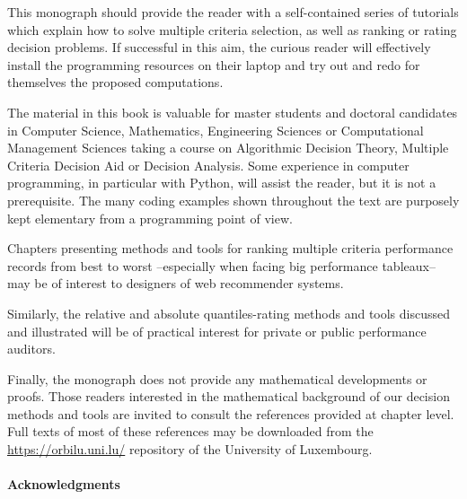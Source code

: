 
This monograph should provide the reader with a self-contained series of tutorials which explain how to solve multiple criteria selection, as well as ranking or rating decision problems. If successful in this aim, the curious reader will effectively install the \Digraph programming resources on their laptop and try out and redo for themselves the proposed computations.


The material in this book is valuable for master students and doctoral candidates in Computer Science, Mathematics, Engineering Sciences or Computational Management Sciences taking a course on Algorithmic Decision Theory, Multiple Criteria Decision Aid or Decision Analysis. Some experience in computer programming, in particular with Python, will assist the reader, but it is not a prerequisite. The many coding examples shown throughout the text are purposely kept elementary from a programming point of view. 

Chapters presenting methods and tools for ranking multiple criteria performance records from best to worst --especially when facing big performance tableaux-- may be of interest to designers of web recommender systems. 

Similarly, the relative and absolute quantiles-rating methods and tools discussed and illustrated will be of practical interest for private or public performance auditors.

Finally, the monograph does not provide any mathematical developments or proofs. Those readers interested in the mathematical background of our decision methods and tools are invited to consult the references provided at chapter level. Full texts of most of these references may be downloaded from the \href{https://orbilu.uni.lu/}{https://orbilu.uni.lu/} repository of the University of Luxembourg. 

\pagebreak

\paragraph{Acknowledgments}

